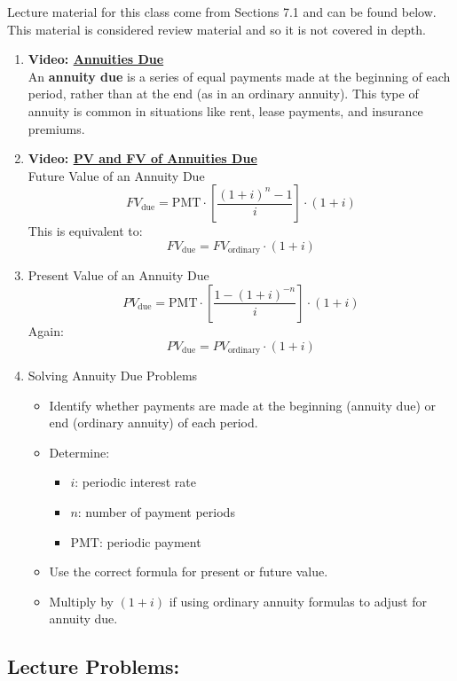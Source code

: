 \documentclass[
]{book}
\providecommand{\tightlist}{%
  \setlength{\itemsep}{0pt}\setlength{\parskip}{0pt}}
\begin{document}
Lecture material for this class come from Sections 7.1 and can be found below. This material is considered review material and so it is not covered in depth.

\begin{enumerate}
\def\labelenumi{\arabic{enumi}.}
\tightlist
\item
  \textbf{Video: \href{https://youtu.be/xalP41MWGSg}{Annuities Due}}\\
  An \textbf{annuity due} is a series of equal payments made at the beginning of each period, rather than at the end (as in an ordinary annuity). This type of annuity is common in situations like rent, lease payments, and insurance premiums.
\item
  \textbf{Video: \href{https://youtu.be/knuOJ03sshA}{PV and FV of Annuities Due}}\\
  Future Value of an Annuity Due
  \[
  FV_{\text{due}} = \text{PMT} \cdot \left[\frac{(1 + i)^n - 1}{i} \right] \cdot (1 + i)
  \]
  This is equivalent to:
  \[
  FV_{\text{due}} = FV_{\text{ordinary}} \cdot (1 + i)
  \]
\item
  Present Value of an Annuity Due
  \[
  PV_{\text{due}} = \text{PMT} \cdot \left[\frac{1 - (1 + i)^{-n}}{i} \right] \cdot (1 + i)
  \]
  Again:
  \[
  PV_{\text{due}} = PV_{\text{ordinary}} \cdot (1 + i)
  \]
\item
  Solving Annuity Due Problems

  \begin{itemize}
  \tightlist
  \item
    Identify whether payments are made at the beginning (annuity due) or end (ordinary annuity) of each period.
  \item
    Determine:

    \begin{itemize}
    \tightlist
    \item
      \(i\): periodic interest rate
    \item
      \(n\): number of payment periods
    \item
      \(\text{PMT}\): periodic payment
    \end{itemize}
  \item
    Use the correct formula for present or future value.
  \item
    Multiply by \((1 + i)\) if using ordinary annuity formulas to adjust for annuity due.
  \end{itemize}
\end{enumerate}

\subsection*{Lecture Problems:}\label{lecture-problems-16}
\end{document}
